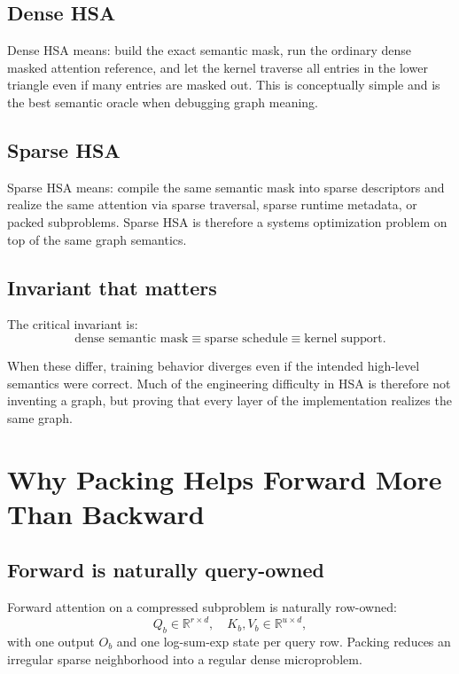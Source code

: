 \documentclass[11pt]{article}
\begin{document}
\subsection{Dense HSA}

Dense HSA means: build the exact semantic mask, run the ordinary dense masked
attention reference, and let the kernel traverse all entries in the lower
triangle even if many entries are masked out. This is conceptually simple and is
the best semantic oracle when debugging graph meaning.

\subsection{Sparse HSA}

Sparse HSA means: compile the same semantic mask into sparse descriptors and
realize the same attention via sparse traversal, sparse runtime metadata, or
packed subproblems. Sparse HSA is therefore a systems optimization problem on
top of the same graph semantics.

\subsection{Invariant that matters}

The critical invariant is:
\[
\text{dense semantic mask} \equiv \text{sparse schedule} \equiv \text{kernel support}.
\]

When these differ, training behavior diverges even if the intended high-level
semantics were correct. Much of the engineering difficulty in HSA is therefore
not inventing a graph, but proving that every layer of the implementation
realizes the same graph.

\section{Why Packing Helps Forward More Than Backward}

\subsection{Forward is naturally query-owned}

Forward attention on a compressed subproblem is naturally row-owned:
\[
Q_b \in \mathbb{R}^{r \times d}, \quad
K_b, V_b \in \mathbb{R}^{u \times d},
\]
with one output $O_b$ and one log-sum-exp state per query row. Packing reduces
an irregular sparse neighborhood into a regular dense microproblem.
\end{document}
